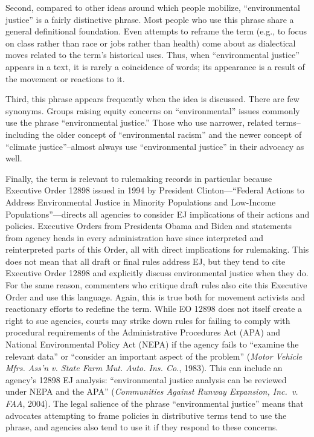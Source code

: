 \documentclass[
      12pt,
        ]{article}
\begin{document}
Second, compared to
other ideas around which people mobilize, ``environmental justice'' is a
fairly distinctive phrase. Most people who use this phrase share a
general definitional foundation. Even attempts to reframe the term (e.g., to focus on class rather than race or jobs rather than health) come about as dialectical moves related to the term's historical uses. Thus, when ``environmental justice'' appears in a text, it is rarely a coincidence of words; its appearance is a result of the movement or reactions to it.

Third, this phrase appears frequently
when the idea is discussed. There are few synonyms. Groups raising equity concerns on ``environmental'' issues commonly use the phrase ``environmental justice.'' Those who use narrower, related terms--including the older concept of
``environmental racism'' and the newer concept of ``climate justice''--almost always use ``environmental justice'' in their advocacy as well.

Finally, the term is relevant to rulemaking records in
particular because Executive Order 12898 issued in 1994 by President
Clinton---``Federal Actions to Address Environmental Justice in Minority
Populations and Low-Income Populations''---directs all agencies to consider EJ implications of their actions and policies. Executive Orders from Presidents Obama and Biden and statements from agency heads in every administration have since interpreted and reinterpreted parts of this Order, all with direct implications for rulemaking.
This does not mean that all draft or final rules address EJ, but they tend to cite Executive Order 12898 and explicitly discuss
environmental justice when they do. For the same reason, commenters who critique draft rules also cite this Executive Order and use this language. Again, this is true both for movement activists and reactionary efforts to redefine the term.
While EO 12898 does not itself create a right to sue agencies, courts may strike down rules for failing to comply with procedural requirements of the Administrative Procedures Act (APA) and National Environmental Policy Act (NEPA) if the agency fails to ``examine the relevant data'' or ``consider an important aspect of the problem'' (\emph{Motor Vehicle Mfrs. Ass'n v. State Farm Mut. Auto. Ins. Co.}, 1983). This can include an agency's 12898 EJ analysis: ``environmental justice analysis can be reviewed under NEPA and the APA'' (\emph{Communities Against Runway Expansion, Inc.~v. FAA}, 2004). The legal salience of the phrase ``environmental justice'' means that advocates attempting to frame policies in distributive terms tend to use the phrase, and agencies also tend to use it if they respond to these concerns.
\end{document}
